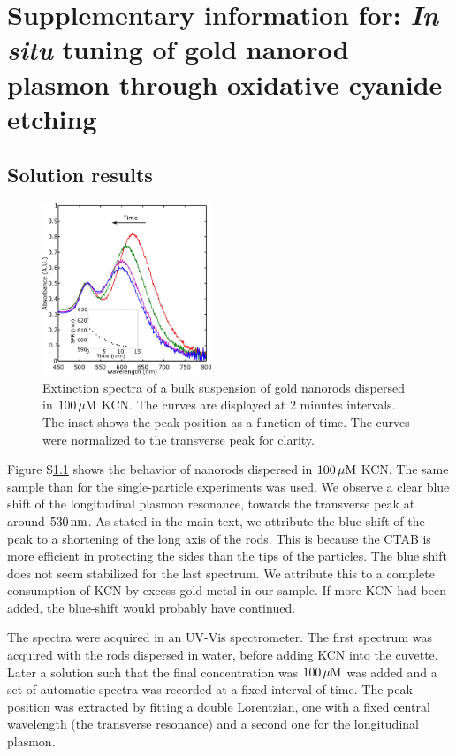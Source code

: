 \chapter[Cyanide Etching]{Supplementary information for: \textit{In situ} tuning of gold
nanorod plasmon through oxidative cyanide etching}
\label{ch:SKCN}

\newpage

\section{Solution results}
\begin{figure}[htp]
 \centering
 \includegraphics[width=0.45\textwidth]{Chapters/02_KCN/Figures/04_Supporting/01_Bulk/01_bulk.png}
 \caption{Extinction spectra of a bulk suspension of gold nanorods dispersed in
 $100\,\mu\textrm{M}$ KCN. The curves are displayed at 2 minutes intervals. The
 inset shows the peak position as a function of time. The curves were normalized
 to the transverse peak for clarity.}
 \label{fig:Bulk}
\end{figure}

Figure S\ref{fig:Bulk} shows the behavior of nanorods dispersed in $100\,\mu\textrm{M}$ KCN.
The same sample than for the single-particle experiments was used.
We observe a clear blue shift of the longitudinal plasmon resonance, towards the
transverse peak at around $530\,\textrm{nm}$. As stated in the main text, we attribute the
blue shift of the peak to a shortening of the long axis of the rods. This is
because the CTAB is more efficient in protecting the sides than the tips of the
particles. The blue shift does not seem stabilized for the last spectrum. We
attribute this to a complete consumption of KCN by excess gold metal in our
sample. If more KCN had been added, the blue-shift would probably have
continued.

The spectra were acquired in an UV-Vis spectrometer. The first spectrum was
acquired with the rods dispersed in water, before adding KCN into the cuvette.
Later a solution such that the final concentration was $100\,\mu\textrm{M}$ was added and a
set of automatic spectra was recorded at a fixed interval of time. The peak
position was extracted by fitting a double Lorentzian, one with a fixed central
wavelength (the transverse resonance) and a second one for the longitudinal
plasmon.

